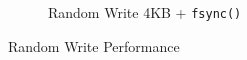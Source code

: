 \begin{figure}[tp]
\begin{subfigure}[b]{0.48\textwidth}
 \caption{Random Write 4KB + \texttt{fsync()}} 
 \label{fig:SAF:4k_fsync}
\end{subfigure} \hfil
 \caption{Random Write Performance}
 \label{fig:SAF:motivation}
\end{figure}


\lipsum[1-4]
